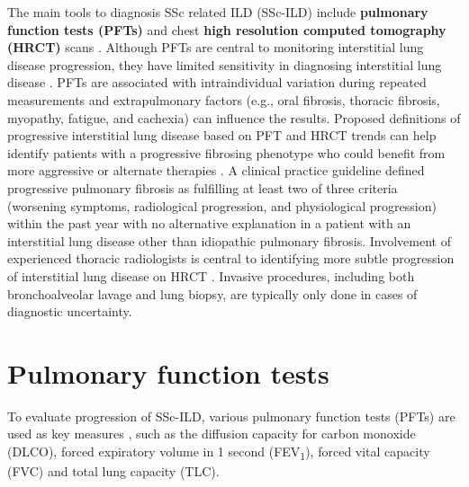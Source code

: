 The main tools to diagnosis SSc related ILD (SSc-ILD) include \textbf{pulmonary function tests (PFTs)} and chest\textbf{ high resolution computed tomography (HRCT) }scans \cite{codes2023systemic}. Although PFTs are central to monitoring interstitial lung disease progression, they have limited sensitivity in diagnosing interstitial lung disease \cite{bernstein2020performance}. PFTs are associated with intraindividual variation during repeated measurements and extrapulmonary factors (e.g., oral fibrosis, thoracic fibrosis, myopathy, fatigue, and cachexia) can influence the results. Proposed definitions of progressive interstitial lung disease based on PFT and HRCT trends can help identify patients with a progressive fibrosing phenotype who could benefit from more aggressive or alternate therapies \cite{distler2020predictors}. A clinical practice guideline defined progressive pulmonary fibrosis as fulfilling at least two of three criteria (worsening symptoms, radiological progression, and physiological progression) within the past year with no alternative explanation in a patient with an interstitial lung disease other than idiopathic pulmonary fibrosis. Involvement of experienced thoracic radiologists is central to identifying more subtle progression of interstitial lung disease on HRCT \cite{raghu2022idiopathic}. Invasive procedures, including both bronchoalveolar lavage and lung biopsy, are typically only done in cases of diagnostic uncertainty. 

\section{Pulmonary function tests}

To evaluate progression of SSc-ILD, various pulmonary function tests (PFTs) are used as key measures \cite{Behr2008, Caron2018, Ninaber2015}, such as the diffusion capacity for carbon monoxide (DLCO), forced expiratory volume in 1 second (FEV\textsubscript{1}), forced vital capacity (FVC) and total lung capacity (TLC). 

